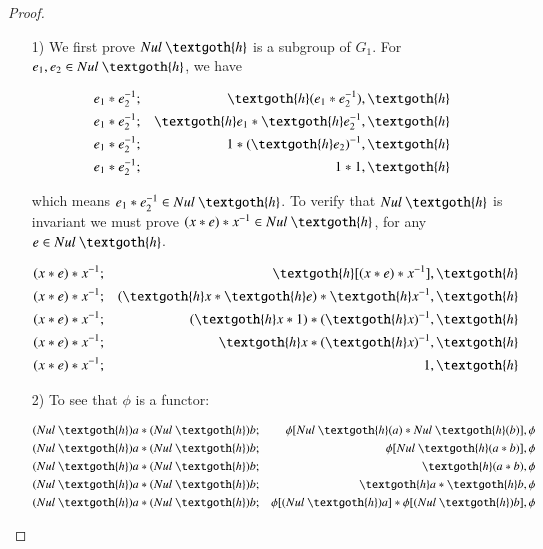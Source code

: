 \documentclass [12pt]{book}
\begin{document}
\begin{proof}\makebox[5pt][]{}\mbox {}

\begin{itemize}

\item[1)]We first prove $Nul~\textgoth{h}$ is a subgroup of $G_{1}$. For $e_1,e_2\in Nul~\textgoth{h}$, we have

\begin{eqnarray}\nonumber e_{1}*e_{2}^{-1}&;&\textgoth{h}(e_{1}*e_{2}^{-1}),\textgoth{h}\\\nonumber e_{1}*e_{2}^{-1}&;&\textgoth{h}e_{1}*\textgoth{h}
e_{2}^{-1},\textgoth{h}\\\nonumber e_{1}*e_{2}^{-1}&;&1*(\textgoth{h}
e_{2})^{-1},\textgoth{h}\\\nonumber e_ {1}*e_{2}^{-1}&;&1*1,\textgoth{h}\end{eqnarray}

which means $e_{1}*e^{-1}_{2}\in Nul~\textgoth{h}$. To verify that $Nul~\textgoth{h}$ is invariant we must prove $(x*e)*x^{-1}\in Nul~\textgoth{h}$, for any $e\in Nul~\textgoth{h}$.

\begin{eqnarray}\nonumber (x*e)*x^{-1}&;&\textgoth{h}[(x*e)*x^{-1}],\textgoth{h}\\\nonumber(x*e)*x^{-1}&;&(\textgoth{h}x*\textgoth{h}e)*
\textgoth{h}x^{-1},\textgoth{h}\\\nonumber(x*e)*x^{-1}&;&(\textgoth{h}x*1)*(
\textgoth{h}x)^{-1},\textgoth{h}\\\nonumber(x*e)*x^{-1}&;&\textgoth{h}x*(
\textgoth{h}x)^{-1},\textgoth{h}\\\nonumber(x*e)*x^{-1}&;&1,\textgoth{h}\end{eqnarray}

\item[2)] To see that $\phi$ is a functor:

\begin{eqnarray}\nonumber(Nul~\textgoth{h})a*(Nul~\textgoth{h})b&;&
\phi[Nul~\textgoth{h}(a)*Nul~\textgoth{h}(b)],\phi\\\nonumber(Nul~\textgoth{h})a*(Nul~\textgoth{h})b&;&
\phi[Nul~\textgoth{h}(a*b)],\phi\\\nonumber(Nul~\textgoth{h})a*(Nul~\textgoth{h})b&;&
\textgoth{h}(a*b),\phi\\\nonumber(Nul~\textgoth{h})a*(Nul~\textgoth{h})b&;&\textgoth{h}
a*\textgoth{h}b,\phi
\\\nonumber(Nul~\textgoth{h})a*(Nul~\textgoth{h})b&;&
\phi[(Nul~\textgoth{h})a]*\phi[(Nul~\textgoth{h})b],\phi\end{eqnarray}


\end{itemize}
\end{proof}
\end{document}
